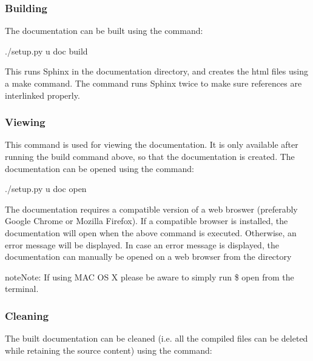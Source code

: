 \documentclass[letterpaper,10pt,english]{sphinxmanual}
\begin{document}
\subsubsection{Building}
\label{\detokenize{gridpyfiles/documentation:building}}
The documentation can be built using the command:

\begin{sphinxVerbatim}[commandchars=\\\{\}]
\PYGZdl{} ./setup.py \PYGZhy{}u doc build
\end{sphinxVerbatim}

This runs Sphinx in the documentation directory, and creates the html files using a make command. The command runs Sphinx twice to make sure references are interlinked properly.


\subsubsection{Viewing}
\label{\detokenize{gridpyfiles/documentation:viewing}}
This command is used for viewing the documentation. It is only available after running the build command above, so that the documentation is created. The documentation can be opened using the command:

\begin{sphinxVerbatim}[commandchars=\\\{\}]
\PYGZdl{} ./setup.py \PYGZhy{}u doc open
\end{sphinxVerbatim}

The documentation requires a compatible version of a web broswer (preferably Google Chrome or Mozilla Firefox). If a compatible browser is installed, the documentation will open when the above command is executed. Otherwise, an error message will be displayed. In case an error message is displayed, the documentation can manually be opened on a web browser from the directory 

\begin{sphinxadmonition}{note}{Note:}
If using MAC OS X please be aware to simply run \$ open  from the terminal.
\end{sphinxadmonition}


\subsubsection{Cleaning}
\label{\detokenize{gridpyfiles/documentation:cleaning}}
The built documentation can be cleaned (i.e. all the compiled files can be deleted while retaining the source content) using the command:
\end{document}
